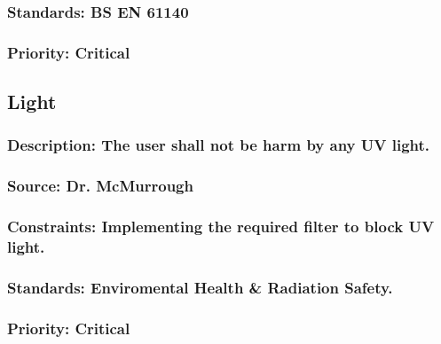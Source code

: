 \subsubsection{Standards: BS EN 61140}
\subsubsection{Priority: Critical}

\subsection{\bfUV Light}
\subsubsection{Description: The user shall not be harm by any UV light.}
\subsubsection{Source: Dr. McMurrough}
\subsubsection{Constraints: Implementing the required filter to block UV light.}
\subsubsection{Standards: Enviromental Health & Radiation Safety.}
\subsubsection{Priority: Critical}
